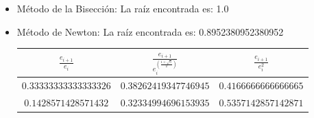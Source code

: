 \documentclass{article}
\begin{document}
\begin{enumerate}[I)]
\begin{enumerate}[(1)]
\begin{itemize}
\item Método de la Bisección: La raíz encontrada es: 1.0
\item Método de Newton: La raíz encontrada es: 0.8952380952380952 \\
\newline
\begin{tabular}{|c|c|c|}
\hline
$\frac{e_{i+1}}{e_i}$ & $\frac{e_{i+1}}{e^{\left(\frac{1 + \sqrt{5}}{2}\right)}_i}$ & $\frac{e_{i+1}}{e^2_i}$ \\
\hline
$0.33333333333333326$ & $0.38262419347746945$ & $0.4166666666666665$\\
\hline 
$0.1428571428571432$ & $0.32334994696153935$ & $0.5357142857142871$ \\
\hline 
\end{tabular}
\end{itemize}

\newpage


\end{enumerate}
\end{enumerate}
\end{document}
